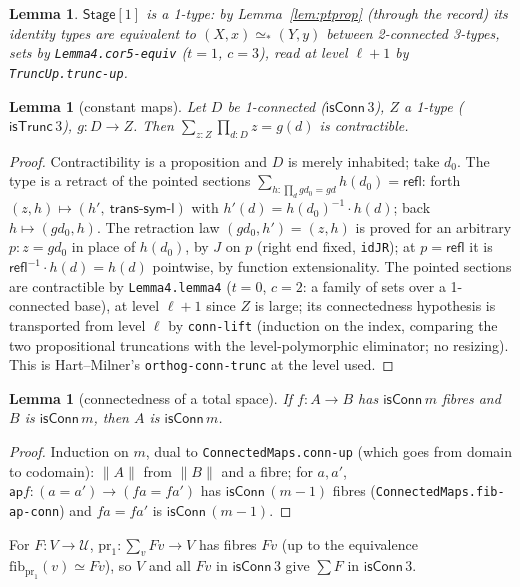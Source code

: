 \documentclass[11pt]{amsart}
\newtheorem{lemma}[theorem]{Lemma}
\theoremstyle{definition}
\theoremstyle{remark}
\newcommand{\code}[1]{\texttt{#1}}
\newcommand{\cT}{\mathsf{isTrunc}}
\newcommand{\cC}{\mathsf{isConn}}
\newcommand{\refl}{\mathsf{refl}}
\newcommand{\ap}{\mathsf{ap}}
\newcommand{\fib}{\mathrm{fib}}
\newcommand{\tr}[1]{\|#1\|}
\newcommand{\St}{\mathsf{Stage}}
\newcommand{\pteq}{\simeq_*}
\newcommand{\U}{\mathcal{U}}
\begin{document}
\begin{lemma}\label{lem:stage} $\St[1]$ is a 1-type: by Lemma~\ref{lem:ptprop} (through the
record) its identity types are equivalent to $(X,x)\pteq(Y,y)$ between 2-connected 3-types, sets
by \code{Lemma4.cor5-equiv} ($t=1$, $c=3$), read at level $\ell{+}1$ by \code{TruncUp.trunc-up}.
\end{lemma}

\begin{lemma}[constant maps]\label{lem:const}
Let $D$ be 1-connected ($\cC\,3$), $Z$ a 1-type ($\cT\,3$), $g:D\to Z$. Then
$\sum_{z:Z}\prod_{d:D}z=g(d)$ is contractible.
\end{lemma}
\begin{proof} Contractibility is a proposition and $D$ is merely inhabited; take $d_0$. The type
is a retract of the pointed sections $\sum_{h:\prod_d g d_0=g d}h(d_0)=\refl$: forth
$(z,h)\mapsto(h',\ \mathsf{trans\text{-}sym\text{-}l})$ with $h'(d)=h(d_0)^{-1}\cdot h(d)$; back
$h\mapsto(g d_0,h)$. The retraction law $(g d_0,h')=(z,h)$ is proved for an arbitrary
$p:z=g d_0$ in place of $h(d_0)$, by $J$ on $p$ (right end fixed, \code{idJR}); at $p=\refl$ it is
$\refl^{-1}\cdot h(d)=h(d)$ pointwise, by function extensionality. The pointed sections are
contractible by \code{Lemma4.lemma4} ($t=0$, $c=2$: a family of sets over a 1-connected base),
at level $\ell{+}1$ since $Z$ is large; its connectedness hypothesis is transported from level
$\ell$ by \code{conn-lift} (induction on the index, comparing the two propositional truncations
with the level-polymorphic eliminator; no resizing). This is Hart--Milner's
\code{orthog-conn-trunc} at the level used. \end{proof}

\begin{lemma}[connectedness of a total space]\label{lem:conn-back}
If $f:A\to B$ has $\cC\,m$ fibres and $B$ is $\cC\,m$, then $A$ is $\cC\,m$.
\end{lemma}
\begin{proof} Induction on $m$, dual to \code{ConnectedMaps.conn-up} (which goes from domain to
codomain): $\tr A$ from $\tr B$ and a fibre;
for $a,a'$, $\ap f:(a=a')\to(fa=fa')$ has $\cC\,(m{-}1)$ fibres
(\code{ConnectedMaps.fib-ap-conn}) and $fa=fa'$ is $\cC\,(m{-}1)$. \end{proof}
For $F:V\to\U$, $\mathrm{pr}_1:\sum_vF v\to V$ has fibres $F v$ (up to the equivalence
$\fib_{\mathrm{pr}_1}(v)\simeq F v$), so $V$ and all $F v$ in $\cC\,3$ give $\sum F$ in $\cC\,3$.
\end{document}
